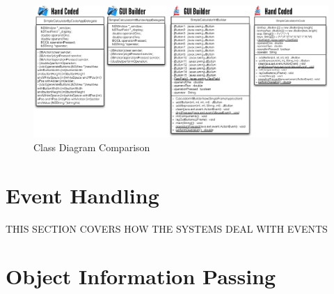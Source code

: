 \documentclass[a4paper,14pt]{article}
\begin{document}
\begin{figure}[H]
\centering
\includegraphics[scale=0.75]{ClassDiagrams.eps}
\caption{Class Diagram Comparison}
\label{fig:classDiagrams}
\end{figure}

\section{Event Handling} %
\label{sec:event_handling}
THIS SECTION COVERS HOW THE SYSTEMS DEAL WITH EVENTS

\section{Object Information Passing} %
\label{sec:object_information_passing}


\newpage
\scriptsize{}

\end{document}
